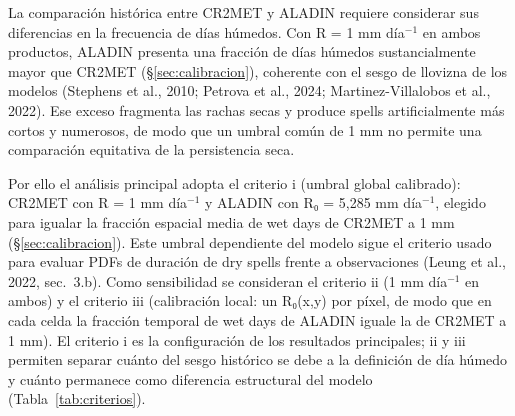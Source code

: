 La comparación histórica entre CR2MET y ALADIN requiere considerar sus diferencias en la frecuencia de días húmedos. Con R = 1 mm día$^{-1}$ en ambos productos, ALADIN presenta una fracción de días húmedos sustancialmente mayor que CR2MET (§\ref{sec:calibracion}), coherente con el sesgo de llovizna de los modelos (Stephens et al., 2010; Petrova et al., 2024; Martinez-Villalobos et al., 2022). Ese exceso fragmenta las rachas secas y produce spells artificialmente más cortos y numerosos, de modo que un umbral común de 1 mm no permite una comparación equitativa de la persistencia seca.

Por ello el análisis principal adopta el criterio i (umbral global calibrado): CR2MET con R = 1 mm día$^{-1}$ y ALADIN con R₀ = 5,285 mm día$^{-1}$, elegido para igualar la fracción espacial media de wet days de CR2MET a 1 mm (§\ref{sec:calibracion}). Este umbral dependiente del modelo sigue el criterio usado para evaluar PDFs de duración de dry spells frente a observaciones (Leung et al., 2022, sec.~3.b). Como sensibilidad se consideran el criterio ii (1 mm día$^{-1}$ en ambos) y el criterio iii (calibración local: un R₀(x,y) por píxel, de modo que en cada celda la fracción temporal de wet days de ALADIN iguale la de CR2MET a 1 mm). El criterio i es la configuración de los resultados principales; ii y iii permiten separar cuánto del sesgo histórico se debe a la definición de día húmedo y cuánto permanece como diferencia estructural del modelo (Tabla~\ref{tab:criterios}).

